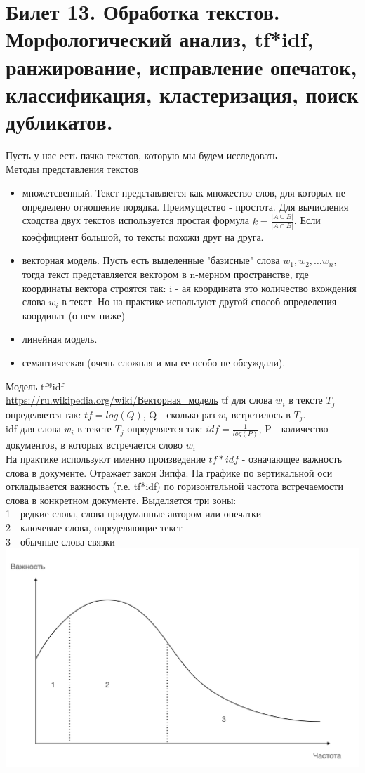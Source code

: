 \newpage
\section {Билет 13. Обработка текстов. Морфологический анализ, tf*idf, ранжирование, исправление опечаток, классификация, кластеризация, поиск дубликатов.}

Пусть у нас есть пачка текстов, которую мы будем исследовать \\
Методы представления текстов
\begin{itemize}
\item множетсвенный. Текст представляется как множество слов, для которых не определено отношение порядка. Преимущество - простота. Для вычисления сходства двух текстов используется простая формула $k = \frac {|A \cup B|}{|A \cap B|}$. Если коэффициент большой, то тексты похожи друг на друга.
\item векторная модель. Пусть есть выделенные  "базисные" слова $w_1, w_2, \dots w_n$, тогда текст представляется вектором в n-мерном пространстве, где координаты вектора строятся так: i - ая координата это количество вхождения слова $w_i$ в текст. Но на практике используют другой способ определения координат (о нем ниже)  
\item линейная модель.
\item семантическая (очень сложная и мы ее особо не обсуждали).
\end{itemize}

Модель tf*idf\\
\url {https://ru.wikipedia.org/wiki/Векторная_модель}
tf для слова $w_i$ в тексте $T_j$ определяется так: 
 $tf = log (Q)$, Q - сколько раз $w_i$ встретилось в $T_j$.  \\
idf для слова $w_i$ в тексте $T_j$ определяется так: 
$idf = \frac{1}{log(P)}$, P - количество документов, в которых встречается слово $w_i$ \\
На практике используют именно произведение $tf*idf$ - означающее важность слова в документе. Отражает закон Зипфа:
На графике по вертикальной оси откладывается важность (т.е. tf*idf) по горизонтальной частота встречаемости слова в конкретном документе.
Выделяется три зоны: \\
1 - редкие слова, слова придуманные автором или опечатки \\
2 - ключевые слова, определяющие текст \\
3 - обычные слова связки \\

\includegraphics[width=0.5\linewidth]{13/Zipf}

